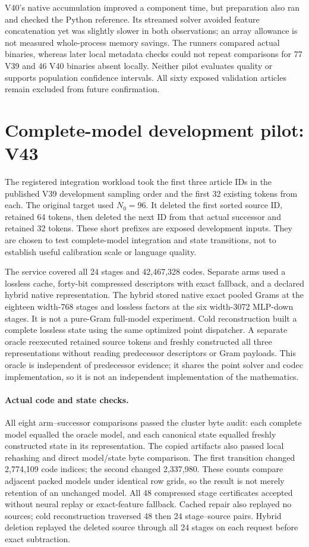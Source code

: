 \documentclass[10pt,twocolumn,letterpaper]{article}
\begin{document}
V40's native accumulation improved a component time, but preparation also ran
and checked the Python reference. Its streamed solver avoided feature
concatenation yet was slightly slower in both observations; an array allowance
is not measured whole-process memory savings. The runners compared actual
binaries, whereas later local metadata checks could not repeat comparisons for
77 V39 and 46 V40 binaries absent locally. Neither pilot evaluates quality or
supports population confidence intervals. All sixty exposed validation articles
remain excluded from future confirmation.

\section{Complete-model development pilot: V43}
\label{sec:v43}
The registered integration workload took the first three article IDs in the
published V39 development sampling order and the first 32 existing tokens from
each. The original target used $N_0=96$. It deleted the first sorted source ID,
retained 64 tokens, then deleted the next ID from that actual successor and retained
32 tokens. These short prefixes are exposed development inputs. They are chosen
to test complete-model integration and state transitions, not to establish useful
calibration scale or language quality.

The service covered all 24 stages and 42,467,328 codes. Separate arms used a lossless
cache, forty-bit compressed descriptors with exact fallback, and a declared hybrid
native representation. The hybrid stored native exact pooled Grams at the eighteen
width-768 stages and lossless factors at the six width-3072 MLP-down stages. It is
not a pure-Gram full-model experiment. Cold reconstruction built a complete
lossless state using the same optimized point dispatcher. A separate oracle
reexecuted retained source tokens and freshly constructed all three representations
without reading predecessor descriptors or Gram payloads. This oracle is
independent of predecessor evidence; it shares the point solver and codec
implementation, so it is not an independent implementation of the mathematics.

\paragraph{Actual code and state checks.}
All eight arm--successor comparisons passed the cluster byte audit: each complete
model equalled the oracle model, and each canonical state equalled freshly
constructed state in its representation. The copied artifacts also passed local
rehashing and direct model/state byte comparison. The first transition changed
2,774,109 code indices; the second changed 2,337,980. These counts compare adjacent
packed models under identical row grids, so the result is not merely retention of
an unchanged model. All 48 compressed stage certificates accepted without neural
replay or exact-feature fallback. Cached repair also replayed no sources; cold
reconstruction traversed 48 then 24 stage--source pairs. Hybrid deletion replayed
the deleted source through all 24 stages on each request before exact subtraction.
\end{document}
